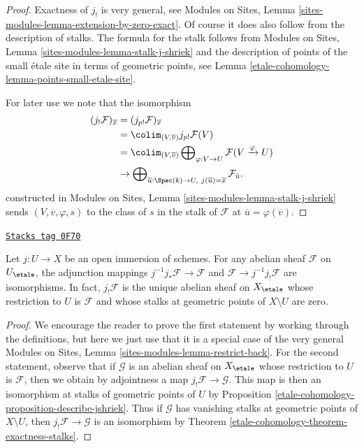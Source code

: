 \begin{proof}
Exactness of $j_!$ is very general, see Modules on Sites,
Lemma \ref{sites-modules-lemma-extension-by-zero-exact}.
Of course it does also follow from the description of stalks.
The formula for the stalk follows from
Modules on Sites, Lemma \ref{sites-modules-lemma-stalk-j-shriek}
and the description of points of the small \'etale site
in terms of geometric points, see Lemma \ref{etale-cohomology-lemma-points-small-etale-site}.

\medskip\noindent
For later use we note that the isomorphism
\begin{align*}
(j_!\mathcal{F})_{\overline{x}}
& =
(j_{p!}\mathcal{F})_{\overline{x}} \\
& =
\colim_{(V, \overline{v})} j_{p!}\mathcal{F}(V) \\
& =
\colim_{(V, \overline{v})}
\bigoplus\nolimits_{\varphi : V \to U}
\mathcal{F}(V \xrightarrow{\varphi} U) \\
& \to
\bigoplus\nolimits_{\overline{u} : \Spec(k) \to U,\ j(\overline{u}) =
\overline{x}} \mathcal{F}_{\bar{u}}.
\end{align*}
constructed in Modules on Sites, Lemma \ref{sites-modules-lemma-stalk-j-shriek}
sends $(V, \overline{v}, \varphi, s)$ to the class of $s$ in the stalk
of $\mathcal{F}$ at $\overline{u} = \varphi(\overline{v})$.
\end{proof}

\begin{lemma}
\label{etale-cohomology-lemma-jshriek-open}
\href{https://stacks.math.columbia.edu/tag/0F70}{\texttt{Stacks tag 0F70}}

Let $j : U \to X$ be an open immersion of schemes. For any
abelian sheaf $\mathcal{F}$ on $U_\etale$, the adjunction mappings
$j^{-1}j_*\mathcal{F} \to \mathcal{F}$ and
$\mathcal{F} \to j^{-1}j_!\mathcal{F}$ are isomorphisms.
In fact, $j_!\mathcal{F}$ is the unique abelian sheaf on $X_\etale$
whose restriction to $U$ is $\mathcal{F}$ and whose stalks at
geometric points of $X \setminus U$ are zero.
\end{lemma}

\begin{proof}
We encourage the reader to prove the first statement by working through the
definitions, but here we just use that it is a special case of the very general
Modules on Sites, Lemma \ref{sites-modules-lemma-restrict-back}.
For the second statement, observe that if $\mathcal{G}$ is an abelian sheaf
on $X_\etale$ whose restriction to $U$ is $\mathcal{F}$, then we obtain
by adjointness a map $j_!\mathcal{F} \to \mathcal{G}$. This map
is then an isomorphism at stalks of geometric points of $U$ by
Proposition \ref{etale-cohomology-proposition-describe-jshriek}.
Thus if $\mathcal{G}$ has vanishing stalks at geometric points
of $X \setminus U$, then $j_!\mathcal{F} \to \mathcal{G}$ is an
isomorphism by Theorem \ref{etale-cohomology-theorem-exactness-stalks}.
\end{proof}

